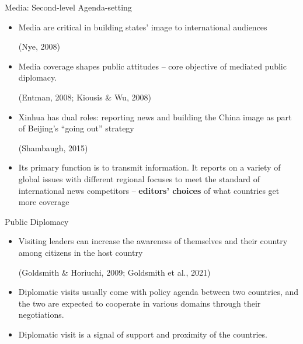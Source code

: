 \documentclass{beamer}
\begin{document}
\begin{frame}{Media: Second-level Agenda-setting}


\begin{itemize}
\item Media are critical in building states’ image to international audiences \begin{footnotesize} (Nye, 2008) \end{footnotesize}

\item Media coverage shapes public attitudes -- core objective of mediated public diplomacy. \begin{footnotesize} (Entman, 2008; Kiousis \& Wu, 2008) \end{footnotesize}

\item Xinhua has dual roles: reporting news and building the China
image as part of Beijing’s “going out” strategy \begin{footnotesize} (Shambaugh, 2015) \end{footnotesize}

\item Its primary function is to transmit information. It reports on a variety of global issues
with different regional focuses to meet the standard of international news competitors -- \textbf{editors' choices} of what countries get more coverage
\end{itemize}

\end{frame}

\begin{frame}{Public Diplomacy}


\begin{itemize}
\item Visiting leaders can increase the awareness of themselves and their country among
citizens in the host country \begin{footnotesize} (Goldsmith \& Horiuchi, 2009; Goldsmith et al., 2021) \end{footnotesize}

\item Diplomatic visits usually come with policy agenda between two countries,
and the two are expected to cooperate in various domains through their negotiations.

\item Diplomatic visit is a signal of support and proximity of
the countries.

\end{itemize}

\end{frame}
\end{document}
